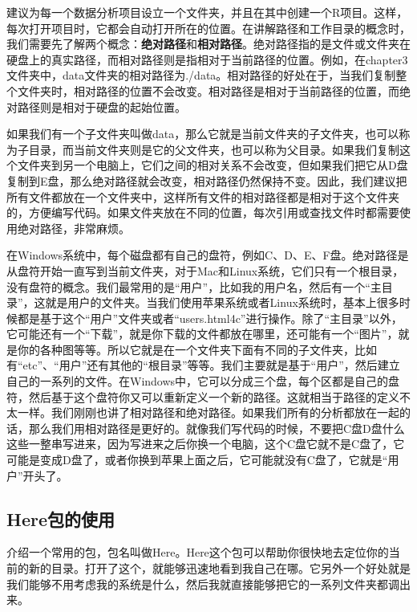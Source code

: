 \documentclass[
  oneside]{book}
\begin{document}
建议为每一个数据分析项目设立一个文件夹，并且在其中创建一个R项目。这样，每次打开项目时，它都会自动打开所在的位置。在讲解路径和工作目录的概念时，我们需要先了解两个概念：\textbf{绝对路径}和\textbf{相对路径}。绝对路径指的是文件或文件夹在硬盘上的真实路径，而相对路径则是指相对于当前路径的位置。例如，在chapter3文件夹中，data文件夹的相对路径为./data。相对路径的好处在于，当我们复制整个文件夹时，相对路径的位置不会改变。相对路径是相对于当前路径的位置，而绝对路径则是相对于硬盘的起始位置。

如果我们有一个子文件夹叫做data，那么它就是当前文件夹的子文件夹，也可以称为子目录，而当前文件夹则是它的父文件夹，也可以称为父目录。如果我们复制这个文件夹到另一个电脑上，它们之间的相对关系不会改变，但如果我们把它从D盘复制到E盘，那么绝对路径就会改变，相对路径仍然保持不变。因此，我们建议把所有文件都放在一个文件夹中，这样所有文件的相对路径都是相对于这个文件夹的，方便编写代码。如果文件夹放在不同的位置，每次引用或查找文件时都需要使用绝对路径，非常麻烦。

在Windows系统中，每个磁盘都有自己的盘符，例如C、D、E、F盘。绝对路径是从盘符开始一直写到当前文件夹，对于Mac和Linux系统，它们只有一个根目录，没有盘符的概念。我们最常用的是``用户''，比如我的用户名，然后有一个``主目录''，这就是用户的文件夹。当我们使用苹果系统或者Linux系统时，基本上很多时候都是基于这个``用户''文件夹或者``users.html4c''进行操作。除了``主目录''以外，它可能还有一个``下载''，就是你下载的文件都放在哪里，还可能有一个``图片''，就是你的各种图等等。所以它就是在一个文件夹下面有不同的子文件夹，比如有``etc''、``用户''还有其他的``根目录''等等。我们主要就是基于``用户''，然后建立自己的一系列的文件。在Windows中，它可以分成三个盘，每个区都是自己的盘符，然后基于这个盘符你又可以重新定义一个新的路径。这就相当于路径的定义不太一样。我们刚刚也讲了相对路径和绝对路径。如果我们所有的分析都放在一起的话，那么我们用相对路径是更好的。就像我们写代码的时候，不要把C盘D盘什么这些一整串写进来，因为写进来之后你换一个电脑，这个C盘它就不是C盘了，它可能是变成D盘了，或者你换到苹果上面之后，它可能就没有C盘了，它就是``用户''开头了。

\hypertarget{3-packge-here}{%
\subsection{Here包的使用}\label{3-packge-here}}

介绍一个常用的包，包名叫做Here。Here这个包可以帮助你很快地去定位你的当前的新的目录。打开了这个，就能够迅速地看到我自己在哪。它另外一个好处就是我们能够不用考虑我的系统是什么，然后我就直接能够把它的一系列文件夹都调出来。
\end{document}
